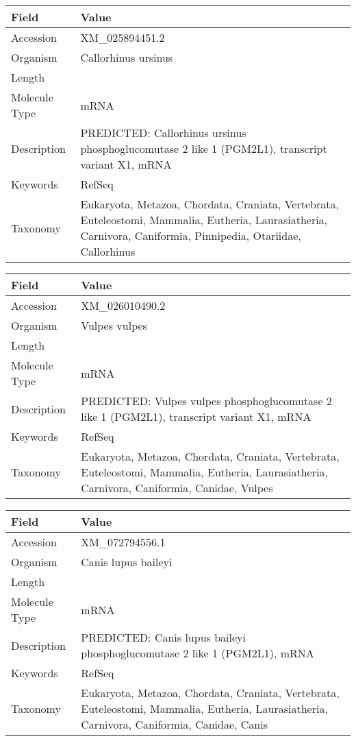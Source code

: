 \documentclass[10pt]{article}
\begin{document}
{\footnotesize
\begin{longtable}{>{\raggedright\arraybackslash}p{4.5cm} >{\raggedright\arraybackslash}p{11.5cm}}
\textbf{Field} & \textbf{Value} \\
\hline
Accession & XM\_025894451.2 \\
Organism & Callorhinus ursinus \\
Length & 2883 \\
Molecule Type & mRNA \\
Description & PREDICTED: Callorhinus ursinus phosphoglucomutase 2 like 1 (PGM2L1), transcript variant X1, mRNA \\
Keywords & RefSeq \\
Taxonomy & Eukaryota, Metazoa, Chordata, Craniata, Vertebrata, Euteleostomi, Mammalia, Eutheria, Laurasiatheria, Carnivora, Caniformia, Pinnipedia, Otariidae, Callorhinus \\
\end{longtable}
}

{\footnotesize
\begin{longtable}{>{\raggedright\arraybackslash}p{4.5cm} >{\raggedright\arraybackslash}p{11.5cm}}
\textbf{Field} & \textbf{Value} \\
\hline
Accession & XM\_026010490.2 \\
Organism & Vulpes vulpes \\
Length & 7882 \\
Molecule Type & mRNA \\
Description & PREDICTED: Vulpes vulpes phosphoglucomutase 2 like 1 (PGM2L1), transcript variant X1, mRNA \\
Keywords & RefSeq \\
Taxonomy & Eukaryota, Metazoa, Chordata, Craniata, Vertebrata, Euteleostomi, Mammalia, Eutheria, Laurasiatheria, Carnivora, Caniformia, Canidae, Vulpes \\
\end{longtable}
}

{\footnotesize
\begin{longtable}{>{\raggedright\arraybackslash}p{4.5cm} >{\raggedright\arraybackslash}p{11.5cm}}
\textbf{Field} & \textbf{Value} \\
\hline
Accession & XM\_072794556.1 \\
Organism & Canis lupus baileyi \\
Length & 7945 \\
Molecule Type & mRNA \\
Description & PREDICTED: Canis lupus baileyi phosphoglucomutase 2 like 1 (PGM2L1), mRNA \\
Keywords & RefSeq \\
Taxonomy & Eukaryota, Metazoa, Chordata, Craniata, Vertebrata, Euteleostomi, Mammalia, Eutheria, Laurasiatheria, Carnivora, Caniformia, Canidae, Canis \\
\end{longtable}
}
\end{document}

